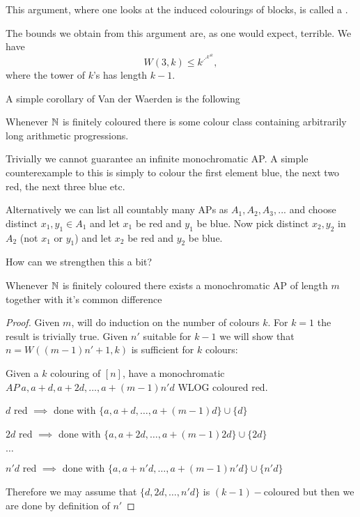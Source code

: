 \documentclass[a4paper]{article}
\begin{document}
This argument, where one looks at the induced colourings of blocks, is called a .

The bounds we obtain from this argument are, as one would expect, terrible. We have
\[
  W(3, k) \leq k^{\iddots^{k^{4k}}},
\]
where the tower of $k$'s has length $k - 1$.

A simple corollary of Van der Waerden is the following
\begin{cor}
Whenever $\mathbb{N}$ is finitely coloured there is some colour class containing arbitrarily long arithmetic progressions.
\end{cor}

Trivially we cannot guarantee an infinite monochromatic AP. A simple counterexample to this is simply to colour the first element blue, the next two red, the next three blue etc.

Alternatively we can list all countably many APs as $A_1, A_2, A_3, ...$ and choose distinct $x_1, y_1 \in A_1$ and let $x_1$ be red and $y_1$ be blue. Now pick distinct $x_2, y_2$ in $A_2$ (not $x_1$ or $y_1$) and let $x_2$ be red and $y_2$ be blue.

How can we strengthen this a bit?

\begin{thm}
Whenever $\mathbb{N}$ is finitely coloured there exists a monochromatic AP of length $m$ together with it's common difference
\end{thm}

\begin{proof}
 Given $m$, will do induction on the number of colours $k$. For $k = 1$ the result is trivially true. Given $n'$ suitable for $k-1$ we will show that $n = W((m-1)n' + 1, k)$ is sufficient for $k$ colours:
 
Given a $k$ colouring of $[n]$, have a monochromatic $AP \ {a, a+d, a + 2d, \dots ,a + (m-1)n'd}$ WLOG coloured red.

\begin{description}
\item $d$ red $\implies$ done with $\{a, a+d, \dots, a+(m-1)d\} \cup \{d\}$
\item $2d$ red $\implies$ done with $\{a, a+2d, \dots, a+(m-1)2d\} \cup \{2d\}$
\item $\dots$
\item $n'd$ red $\implies$ done with $\{a, a+n'd, \dots, a+(m-1)n'd\} \cup \{n'd\}$
\end{description}
Therefore we may assume that $\{d, 2d, \dots, n'd\}$ is $(k-1)-$coloured but then we are done by definition of $n'$
\end{proof}
\end{document}
